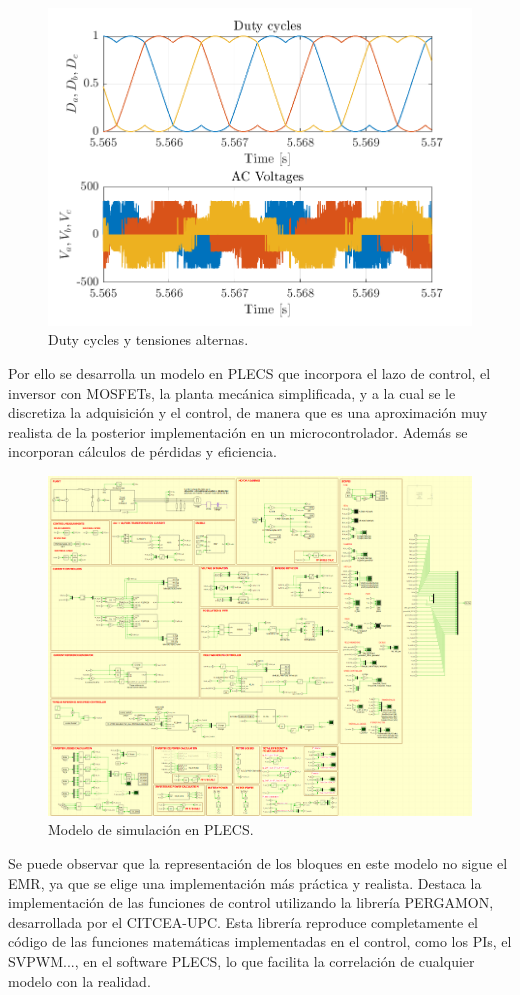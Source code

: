 \begin{figure}[H]
    \centering
    \includegraphics[width=0.85\linewidth]{fig/abc_plot.png}
    \caption{Duty cycles y tensiones alternas.}
    
\end{figure}


Por ello se desarrolla un modelo en PLECS que incorpora el lazo de control, el inversor con MOSFETs, la planta mecánica simplificada, y a la cual se le discretiza la adquisición y el control, de manera que es una aproximación muy realista de la posterior implementación en un microcontrolador. Además se incorporan cálculos de pérdidas y eficiencia.

\begin{figure}[H]
	\centering
	\includegraphics[width=0.7\linewidth]{fig/PLECS_overall}
	\caption{Modelo de simulación en PLECS.}
\end{figure}


Se puede observar que la representación de los bloques en este modelo no sigue el EMR, ya que se elige una implementación más práctica y realista. Destaca la implementación de las funciones de control utilizando la librería PERGAMON, desarrollada por el CITCEA-UPC. Esta librería reproduce completamente el código de las funciones matemáticas implementadas en el control, como los PIs, el SVPWM..., en el software PLECS, lo que facilita la correlación de cualquier modelo con la realidad.

